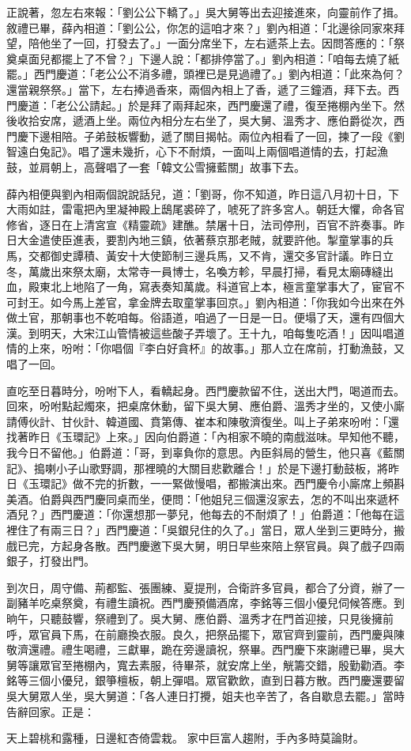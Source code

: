 正說著，忽左右來報：「劉公公下轎了。」吳大舅等出去迎接進來，向靈前作了揖。敘禮已畢，薛內相道：「劉公公，你怎的這咱才來？」劉內相道：「北邊徐同家來拜望，陪他坐了一回，打發去了。」一面分席坐下，左右遞茶上去。因問答應的：「祭奠桌面兒都擺上了不曾？」下邊人說：「都排停當了。」劉內相道：「咱每去燒了紙罷。」西門慶道：「老公公不消多禮，頭裡已是見過禮了。」劉內相道：「此來為何？還當親祭祭。」當下，左右捧過香來，兩個內相上了香，遞了三鐘酒，拜下去。西門慶道：「老公公請起。」於是拜了兩拜起來，西門慶還了禮，復至捲棚內坐下。然後收拾安席，遞酒上坐。兩位內相分左右坐了，吳大舅、溫秀才、應伯爵從次，西門慶下邊相陪。子弟鼓板響動，遞了關目揭帖。兩位內相看了一回，揀了一段《劉智遠白兔記》。唱了還未幾折，心下不耐煩，一面叫上兩個唱道情的去，打起漁鼓，並肩朝上，高聲唱了一套「韓文公雪擁藍關」故事下去。

薛內相便與劉內相兩個說說話兒，道：「劉哥，你不知道，昨日這八月初十日，下大雨如註，雷電把內里凝神殿上鴟尾裘碎了，唬死了許多宮人。朝廷大懼，命各官修省，逐日在上清宮宣《精靈疏》建醮。禁屠十日，法司停刑，百官不許奏事。昨日大金遣使臣進表，要割內地三鎮，依著蔡京那老賊，就要許他。掣童掌事的兵馬，交都御史譚積、黃安十大使節制三邊兵馬，又不肯，還交多官計議。昨日立冬，萬歲出來祭太廟，太常寺一員博士，名喚方軫，早晨打掃，看見太廟磚縫出血，殿東北上地陷了一角，寫表奏知萬歲。科道官上本，極言童掌事大了，宦官不可封王。如今馬上差官，拿金牌去取童掌事回京。」劉內相道：「你我如今出來在外做土官，那朝事也不乾咱每。俗語道，咱過了一日是一日。便塌了天，還有四個大漢。到明天，大宋江山管情被這些酸子弄壞了。王十九，咱每隻吃酒！」因叫唱道情的上來，吩咐：「你唱個『李白好貪杯』的故事。」那人立在席前，打動漁鼓，又唱了一回。

直吃至日暮時分，吩咐下人，看轎起身。西門慶款留不住，送出大門，喝道而去。回來，吩咐點起燭來，把桌席休動，留下吳大舅、應伯爵、溫秀才坐的，又使小廝請傅伙計、甘伙計、韓道國、賁第傳、崔本和陳敬濟復坐。叫上子弟來吩咐：「還找著昨日《玉環記》上來。」因向伯爵道：「內相家不曉的南戲滋味。早知他不聽，我今日不留他。」伯爵道：「哥，到辜負你的意思。內臣斜局的營生，他只喜《藍關記》、搗喇小子山歌野調，那裡曉的大關目悲歡離合！」於是下邊打動鼓板，將昨日《玉環記》做不完的折數，一一緊做慢唱，都搬演出來。西門慶令小廝席上頻斟美酒。伯爵與西門慶同桌而坐，便問：「他姐兒三個還沒家去，怎的不叫出來遞杯酒兒？」西門慶道：「你還想那一夢兒，他每去的不耐煩了！」伯爵道：「他每在這裡住了有兩三日？」西門慶道：「吳銀兒住的久了。」當日，眾人坐到三更時分，搬戲已完，方起身各散。西門慶邀下吳大舅，明日早些來陪上祭官員。與了戲子四兩銀子，打發出門。

到次日，周守備、荊都監、張團練、夏提刑，合衛許多官員，都合了分資，辦了一副豬羊吃桌祭奠，有禮生讀祝。西門慶預備酒席，李銘等三個小優兒伺候答應。到晌午，只聽鼓響，祭禮到了。吳大舅、應伯爵、溫秀才在門首迎接，只見後擁前呼，眾官員下馬，在前廳換衣服。良久，把祭品擺下，眾官齊到靈前，西門慶與陳敬濟還禮。禮生喝禮，三獻畢，跪在旁邊讀祝，祭畢。西門慶下來謝禮已畢，吳大舅等讓眾官至捲棚內，寬去素服，待畢茶，就安席上坐，觥籌交錯，殷勤勸酒。李銘等三個小優兒，銀箏檀板，朝上彈唱。眾官歡飲，直到日暮方散。西門慶還要留吳大舅眾人坐，吳大舅道：「各人連日打攪，姐夫也辛苦了，各自歇息去罷。」當時告辭回家。正是：

天上碧桃和露種，日邊紅杏倚雲栽。
家中巨富人趨附，手內多時莫論財。

